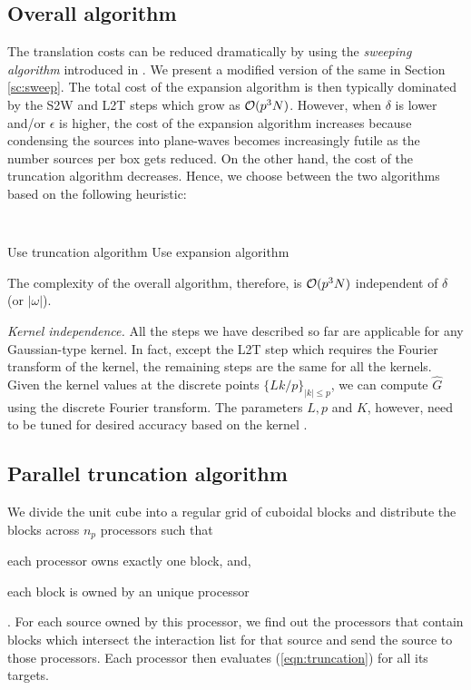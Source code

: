\subsection{Overall algorithm} 
The translation costs can be reduced dramatically by using the {\em sweeping algorithm} introduced in \cite{greengard98}. We present a modified version of the same in Section \ref{sc:sweep}. The total cost of the expansion algorithm is then typically dominated by the S2W and L2T steps which grow as $\mathcal{O}(p^3 N)$. However, when $\delta$ is lower and/or $\epsilon$ is higher, the cost of the expansion algorithm increases because condensing the sources into plane-waves becomes increasingly futile as
 the number sources per box gets reduced. On the other hand, the cost of the truncation algorithm decreases. Hence, we choose between the two algorithms based on the following heuristic:

{\tt
\begin{algorithmic}
\STATE
     \STATE Use truncation algorithm 
  \ELSE 
     \STATE Use expansion algorithm
  \ENDIF
\STATE
\end{algorithmic}
}

The complexity of the overall algorithm, therefore, is $\mathcal{O}(p^3 N)$ independent of $\delta$ (or $|\omega|$).  

{\em Kernel independence.} All the steps we have described so far are applicable for any Gaussian-type kernel. 
In fact, except the L2T step which requires the Fourier transform of the kernel, the remaining steps are the same for all the kernels. Given the kernel values at the discrete points $\{Lk/p \}_{|k| \leq p}$, we can compute $\hat{G}$ using the discrete Fourier transform. The parameters $L, p$ and $K$, however, need to be tuned for desired accuracy based on the kernel \cite{fggt}. 

\subsection{Parallel truncation algorithm}
\label{sc:parallelTruncation}
We divide the unit cube into a regular grid of cuboidal blocks and distribute the blocks across $n_p$ processors
 such that \begin{inparaenum}
\item each processor owns exactly one block, and, \item each block is owned by an unique processor\end{inparaenum}.
 For each source owned by this processor, we find out the processors that contain blocks which intersect the interaction list
 for that source and send the source to those processors. Each processor then evaluates (\ref{eqn:truncation}) for all its targets.
 
